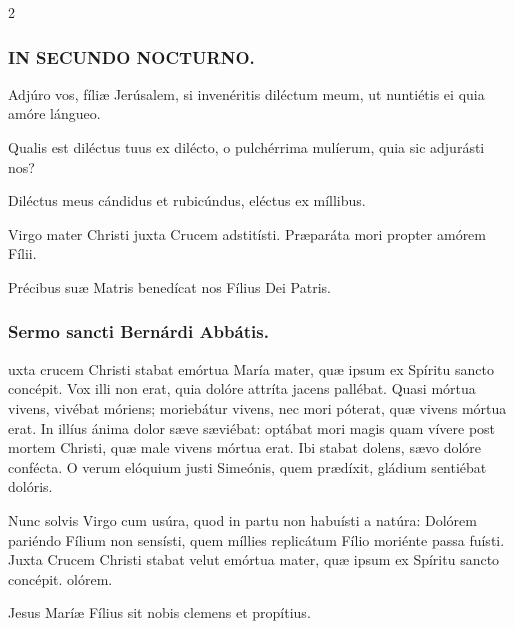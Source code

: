 \documentclass[9pt,twoside]{extarticle}
\begin{document}
\begin{multicols}{2}
\subsubsection*{\center \textsc{IN SECUNDO NOCTURNO.}}
\begin{tightlist}{}
\item {} Adjúro vos, fíliæ Jerúsalem, si invenéritis diléctum meum, ut nuntiétis ei quia amóre lángueo.
\item {} Qualis est diléctus tuus ex dilécto, o pulchérrima mulíerum, quia sic adjurásti nos?
\item {} Diléctus meus cándidus et rubicúndus, eléctus ex míllibus.
\item {} Virgo mater Christi juxta Crucem adstitísti.  Præparáta mori propter amórem Fílii.
\item {\small {} Précibus suæ Matris benedícat nos Fílius Dei Patris.}
\end{tightlist}

\subsubsection*{\center Sermo sancti Bernárdi Abbátis.}
\begin{center}\end{center}
uxta crucem Christi stabat emórtua María mater, quæ ipsum ex Spíritu sancto concépit. Vox illi non erat, quia dolóre attríta jacens pallébat. Quasi mórtua vivens, vivébat móriens; moriebátur vivens, nec mori póterat, quæ vivens mórtua erat. In illíus ánima dolor sæve sæviébat: optábat mori magis quam vívere post mortem Christi, quæ male vivens mórtua erat. Ibi stabat dolens, sævo dolóre confécta. O verum elóquium justi Simeónis, quem prædíxit, gládium sentiébat dolóris.

\begin{tightlist}{}
\item {} Nunc solvis Virgo cum usúra, quod in partu non habuísti a natúra: \textred{*} Dolórem pariéndo Fílium non sensísti, quem míllies replicátum Fílio moriénte passa fuísti.  Juxta Crucem Christi stabat velut emórtua mater, quæ ipsum ex Spíritu sancto concépit. olórem.
\item {\small {} Jesus Maríæ Fílius sit nobis clemens et propítius.}
\end{tightlist}


\end{multicols}
\end{document}
